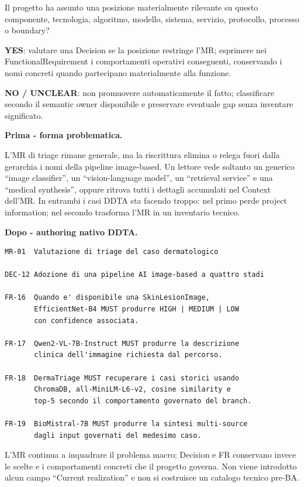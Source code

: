 \documentclass[11pt,a4paper]{article}
\begin{document}
\begin{ddtacheck}[title={Technical / architectural choice routing}]
Il progetto ha assunto una posizione materialmente rilevante su questo componente, tecnologia, algoritmo, modello, sistema, servizio, protocollo, processo o boundary?\par
\textbf{YES}: valutare una Decision se la posizione restringe l'MR; esprimere nei FunctionalRequirement i comportamenti operativi conseguenti, conservando i nomi concreti quando partecipano materialmente alla funzione.\par
\textbf{NO / UNCLEAR}: non promuovere automaticamente il fatto; classificare secondo il semantic owner disponibile e preservare eventuale gap senza inventare significato.
\end{ddtacheck}

\begin{ddtaexample}[title={DermaTriage - prima e dopo una riscrittura troppo astratta}]
\textbf{Prima - forma problematica.}\par
L'MR di triage rimane generale, ma la riscrittura elimina o relega fuori dalla gerarchia i nomi della pipeline image-based. Un lettore vede soltanto un generico ``image classifier'', un ``vision-language model'', un ``retrieval service'' e una ``medical synthesis'', oppure ritrova tutti i dettagli accumulati nel Context dell'MR. In entrambi i casi DDTA sta facendo troppo: nel primo perde project information; nel secondo trasforma l'MR in un inventario tecnico.\par
\medskip
\textbf{Dopo - authoring nativo DDTA.}\par
\begin{lstlisting}
MR-01  Valutazione di triage del caso dermatologico

DEC-12 Adozione di una pipeline AI image-based a quattro stadi

FR-16  Quando e' disponibile una SkinLesionImage,
       EfficientNet-B4 MUST produrre HIGH | MEDIUM | LOW
       con confidence associata.

FR-17  Qwen2-VL-7B-Instruct MUST produrre la descrizione
       clinica dell'immagine richiesta dal percorso.

FR-18  DermaTriage MUST recuperare i casi storici usando
       ChromaDB, all-MiniLM-L6-v2, cosine similarity e
       top-5 secondo il comportamento governato del branch.

FR-19  BioMistral-7B MUST produrre la sintesi multi-source
       dagli input governati del medesimo caso.
\end{lstlisting}
L'MR continua a inquadrare il problema macro; Decision e FR conservano invece le scelte e i comportamenti concreti che il progetto governa. Non viene introdotto alcun campo ``Current realization'' e non si costruisce un catalogo tecnico pre-BA.
\end{ddtaexample}
\end{document}
